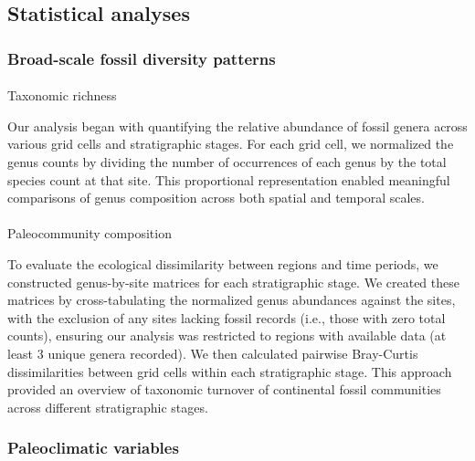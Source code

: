\documentclass[
]{agujournal2019}
\makeatletter
\let\oldparagraph\paragraph
\renewcommand{\paragraph}{
    \@ifstar
      \xxxParagraphStar
      \xxxParagraphNoStar
  }
\newcommand{\xxxParagraphStar}[1]{\oldparagraph*{#1}\mbox{}}
\newcommand{\xxxParagraphNoStar}[1]{\oldparagraph{#1}\mbox{}}
\makeatother
\begin{document}
\subsection{Statistical analyses}\label{statistical-analyses}

\subsubsection{Broad-scale fossil diversity
patterns}\label{broad-scale-fossil-diversity-patterns}

\paragraph{Taxonomic richness}\label{taxonomic-richness}

Our analysis began with quantifying the relative abundance of fossil
genera across various grid cells and stratigraphic stages. For each grid
cell, we normalized the genus counts by dividing the number of
occurrences of each genus by the total species count at that site. This
proportional representation enabled meaningful comparisons of genus
composition across both spatial and temporal scales.

\paragraph{Paleocommunity composition}\label{paleocommunity-composition}

To evaluate the ecological dissimilarity between regions and time
periods, we constructed genus-by-site matrices for each stratigraphic
stage. We created these matrices by cross-tabulating the normalized
genus abundances against the sites, with the exclusion of any sites
lacking fossil records (i.e., those with zero total counts), ensuring
our analysis was restricted to regions with available data (at least 3
unique genera recorded). We then calculated pairwise Bray-Curtis
dissimilarities between grid cells within each stratigraphic stage. This
approach provided an overview of taxonomic turnover of continental
fossil communities across different stratigraphic stages.

\subsubsection{Paleoclimatic variables}\label{paleoclimatic-variables}
\end{document}
